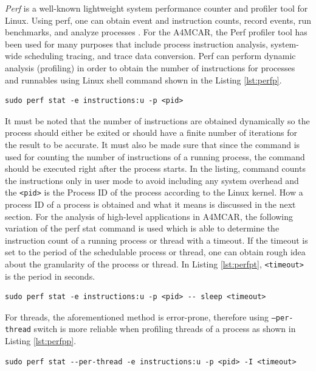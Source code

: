 \textit{Perf} \cite{perf1} \cite{perf2} is a well-known lightweight system performance counter and profiler tool for Linux. Using perf, one can obtain event and instruction counts, record events, run benchmarks, and analyze processes \cite{perf1}. For the A4MCAR, the Perf profiler tool has been used for many purposes that include process instruction analysis, system-wide scheduling tracing, and trace data conversion. Perf can perform dynamic analysis (profiling) in order to obtain the number of instructions for processes and runnables using Linux shell command shown in the Listing \ref{lst:perfp}. 
\begin{lstlisting}[caption={Using perf stat},label={lst:perfp},style=bash]
sudo perf stat -e instructions:u -p <pid>
\end{lstlisting}
It must be noted that the number of instructions are obtained dynamically so the process should either be exited or should have a finite number of iterations for the result to be accurate. It must also be made sure that since the command is used for counting the number of instructions of a running process, the command should be executed right after the process starts. In the listing, command counts the instructions only in user mode to avoid including any system overhead and the \texttt{<pid>} is the Process ID of the process according to the Linux kernel. How a process ID of a process is obtained and what it means is discussed in the next section.
For the analysis of high-level applications in A4MCAR, the following variation of the perf stat command is used which is able to determine the instruction count of a running process or thread with a timeout. If the timeout is set to the period of the schedulable process or thread, one can obtain rough idea about the granularity of the process or thread. In Listing \ref{lst:perfpt}, \texttt{<timeout>} is the period in seconds.
\newpage
\begin{lstlisting}[caption={Using perf stat with timeout},label={lst:perfpt},style=bash]
sudo perf stat -e instructions:u -p <pid> -- sleep <timeout>
\end{lstlisting}
For threads, the aforementioned method is error-prone, therefore using \texttt{--per-thread} switch is more reliable when profiling threads of a process as shown in Listing \ref{lst:perfpp}.
\begin{lstlisting}[caption={Using perf stat with per thread switch},label={lst:perfpp},style=bash]
sudo perf stat --per-thread -e instructions:u -p <pid> -I <timeout>
\end{lstlisting}

